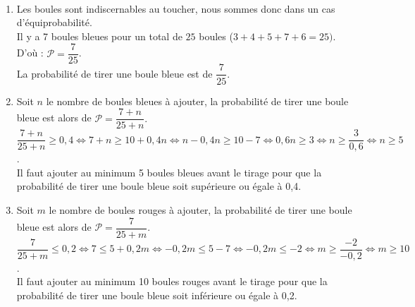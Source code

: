 \begin{corrige}
\ \\ [-5mm]
   \begin{enumerate}
      \item Les boules sont indiscernables au toucher, nous sommes donc dans un cas d'équiprobabilité. \\
         Il y a 7 boules bleues pour un total de $25$ boules ($3+4+5+7+6 =25)$. D'où : $\mathcal{P} =\dfrac{7}{25}$. \\
         {\blue La probabilité de tirer une boule bleue est de $\dfrac7{25}$.}
      \item Soit $n$ le nombre de boules bleues à ajouter, la probabilité de tirer une boule bleue est alors de $\mathcal{P} =\dfrac{7+n}{25+n}.$ \\
         $\dfrac{7+n}{25+n} \geqslant 0,4 \iff
            7+n \geqslant 10+0,4n \iff
            n-0,4n \geqslant 10-7 \iff
            0,6n \geqslant 3 \iff
            n \geqslant \dfrac{3}{0,6} \iff
            n \geqslant 5$. \\ [1mm]
         {\blue Il faut ajouter au minimum 5 boules bleues} avant le tirage pour que la probabilité de tirer une boule bleue soit supérieure ou égale à 0,4.
      \item Soit $m$ le nombre de boules rouges à ajouter, la probabilité de tirer une boule bleue est alors de $\mathcal{P} =\dfrac{7}{25+m}.$  \\
         $\dfrac{7}{25+m} \leqslant 0,2 \iff
          7 \leqslant 5+0,2m \iff
          -0,2m \leqslant 5-7 \iff
          -0,2m \leqslant -2 \iff
          m \geqslant \dfrac{-2}{-0,2} \iff
          m \geqslant 10$. \\ [1mm]
         {\blue Il faut ajouter au minimum 10 boules rouges} avant le tirage pour que la probabilité de tirer une boule bleue soit inférieure ou égale à 0,2.
   \end{enumerate}
\end{corrige}

\smallskip


